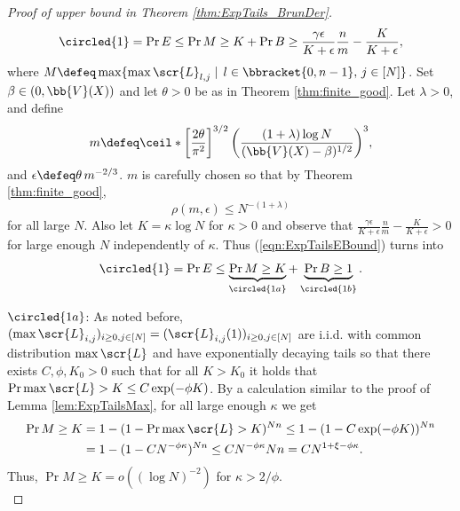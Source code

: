 \begin{proof}[Proof of upper bound in Theorem \ref{thm:ExpTails_BrunDer}]
\begin{equation}\label{eqn:ExpTailsEBound}
\circled{1} = \Pr{E} \leq \Pr{M \geq K} + \Pr{B \geq \frac{\gamma\epsilon}{K + \epsilon}\frac{n}{m} - \frac{K}{K + \epsilon}},  
\end{equation}
where $M \defeq \max \{\max \scr{L}_{l, j} \mid\, l \in \bbracket{0, n - 1},\, j \in [N]\}$. Set $\beta \in (0, \bb{V}(X))$ and let $\theta > 0$ be as in Theorem \ref{thm:finite_good}. Let $\lambda > 0$, and define 
\begin{equation}
m \defeq \ceil*{ \left[\frac{2 \theta}{\pi^2}\right]^{3/2} \left( \frac{(1 + \lambda) \log N}{(\bb{V}(X) - \beta)^{1/2}}\right)^3},
\end{equation} 
and $\epsilon \defeq \theta\, m^{-2/3}$. $m$ is carefully chosen so that by Theorem \ref{thm:finite_good}, 
\begin{equation}\label{eqn:ExpTailsProof}
\rho(m, \epsilon) \leq N^{-(1 + \lambda)} 
\end{equation}
for all large $N$. Also let $K = \kappa \log N$ for $\kappa > 0$ and observe that $\frac{\gamma\epsilon}{K + \epsilon}\frac{n}{m} - \frac{K}{K + \epsilon} > 0$ for large enough $N$ independently of $\kappa$. Thus (\ref{eqn:ExpTailsEBound}) turns into
\begin{equation}
\circled{1} = \Pr{E} \leq \underbrace{\Pr{M \geq K}}_{\circled{1a}} + \underbrace{\Pr{B \geq 1}}_{\circled{1b}}. 
\end{equation}

$\circled{1a}$: As noted before, $(\max \scr{L}_{i,j})_{i \geq 0, j \in [N]} = (\scr{L}_{i, j}(1))_{i \geq 0, j \in [N]}$ are i.i.d. with common distribution $\max \scr{L}$ and have exponentially decaying tails so that there exists $C, \phi, K_0 > 0$ such that for all $K > K_0$ it holds that $\Pr{\max \scr{L} > K} \leq C \exp(-\phi K)$. By a calculation similar to the proof of Lemma \ref{lem:ExpTailsMax}, for all large enough $\kappa$ we get
\begin{align}
\Pr{M \geq K} &= 1 - (1 - \Pr{\max \scr{L} > K})^{Nn} \leq 1 - (1 - C \exp(-\phi K))^{Nn} \\
			  &= 1 - (1 - C N^{-\phi \kappa})^{Nn} \leq C N^{-\phi \kappa} Nn = C N^{1 + \xi - \phi \kappa}. 	
\end{align} 
Thus, $\Pr{M \geq K} = o((\log N)^{-2})$ for $\kappa > 2/\phi$. \\


\end{proof}
